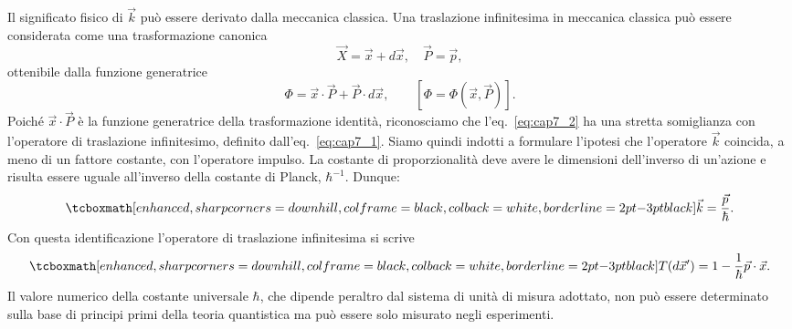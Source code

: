 \documentclass[a4paper,12pt,oneside]{book}
\begin{document}
Il significato fisico di $\vec{k}$ può essere derivato dalla meccanica classica. Una traslazione infinitesima in meccanica classica può essere considerata come una trasformazione canonica
	\begin{equation}
		\vec{X}= \vec{x}+ d\vec{x}, \quad \vec{P}= \vec{p} ,
	\end{equation}
ottenibile dalla funzione generatrice
	\begin{equation}
		\label{eq:cap7_2}
		\Phi = \vec{x}\cdot \vec{P}+\vec{P}\cdot d\vec{x} ,\qquad\left[\Phi=\Phi ( \vec{x}, \vec{P} ) \right].
	\end{equation}
Poiché $\vec{x} \cdot \vec{P}$ è la funzione generatrice della trasformazione identità, riconosciamo che l'eq.~\eqref{eq:cap7_2} ha una stretta somiglianza con l'operatore di traslazione infinitesimo, definito dall'eq.~\eqref{eq:cap7_1}. Siamo quindi indotti a  formulare l'ipotesi che l'operatore $\vec{k}$ coincida, a meno di un fattore costante, con l'operatore impulso. La costante di proporzionalità deve avere le dimensioni dell'inverso di un'azione e risulta essere uguale all'inverso della costante di Planck, $\hbar ^{-1}$. Dunque:
	\begin{equation}
		\tcboxmath[enhanced, sharp corners=downhill, colframe=black, colback=white, borderline={2pt}{-3pt}{black}]{	
			\vec{k}=\frac{\vec{p}}{\hbar}.
			}
	\end{equation}
Con questa identificazione l'operatore di traslazione infinitesima si scrive
	\begin{equation}
		\label{eq:cap7_3}
		\tcboxmath[enhanced, sharp corners=downhill, colframe=black, colback=white, borderline={2pt}{-3pt}{black}]{
			T(d\vec{x}') = 1-\frac{1}{\hbar}\vec{p}\cdot\vec{x}.
			}
	\end{equation}
Il valore numerico della costante universale $\hbar$, che dipende peraltro dal sistema di unità di misura adottato, non può essere determinato sulla base di principi primi della teoria quantistica ma può essere solo misurato negli esperimenti. \\
\end{document}
